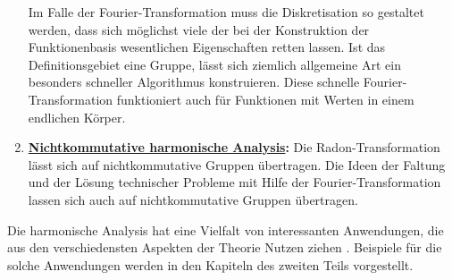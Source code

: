 \begin{enumerate}
Im Falle der Fourier-Transformation muss die Diskretisation so gestaltet
werden, dass sich möglichst viele der bei der Konstruktion der Funktionenbasis
wesentlichen Eigenschaften retten lassen.
Ist das Definitionsgebiet eine Gruppe, lässt sich ziemlich allgemeine
Art ein besonders schneller Algorithmus konstruieren.
Diese schnelle Fourier-Transformation funktioniert auch für Funktionen
mit Werten in einem endlichen Körper.
\item {\bf \hyperref[buch:chapter:nichtkomm]{Nichtkommutative harmonische Analysis}:}
Die Radon-Transformation lässt sich auf nichtkommutative Gruppen
übertragen.
Die Ideen der Faltung und der Lösung technischer Probleme mit Hilfe
der Fourier-Transformation lassen sich auch auf nichtkommutative
Gruppen übertragen.
\end{enumerate}

Die harmonische Analysis hat eine Vielfalt von interessanten
Anwendungen, die aus den verschiedensten Aspekten der Theorie
Nutzen ziehen .
Beispiele für die solche Anwendungen werden in den Kapiteln
des zweiten Teils vorgestellt.


